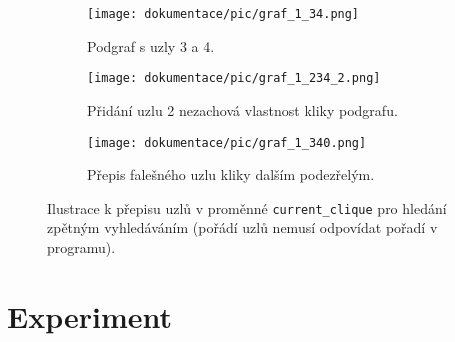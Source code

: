 \documentclass[a4paper]{article}
\begin{document}
        \begin{figure}[h!]
            \centering
            \begin{subfigure}[b]{0.3\textwidth}
                \texttt{[image: dokumentace/pic/graf\_1\_34.png]}
                \caption{Podgraf s uzly 3 a 4.}
            \end{subfigure}
            \begin{subfigure}[b]{0.3\textwidth}
                \texttt{[image: dokumentace/pic/graf\_1\_234\_2.png]}
                \caption{Přidání uzlu 2 nezachová vlastnost kliky podgrafu.}
            \end{subfigure}
            \begin{subfigure}[b]{0.3\textwidth}
                \texttt{[image: dokumentace/pic/graf\_1\_340.png]}
                \caption{Přepis falešného uzlu kliky dalším podezřelým.}
            \end{subfigure}
            \caption{Ilustrace k přepisu uzlů v proměnné \lstinline{current_clique} pro hledání zpětným vyhledáváním (pořádí uzlů nemusí odpovídat pořadí v programu).}
            \label{fig:backtrack_imp}
        \end{figure}


\section{Experiment} \label{sec:experiment}
    
    
    


\end{document}
